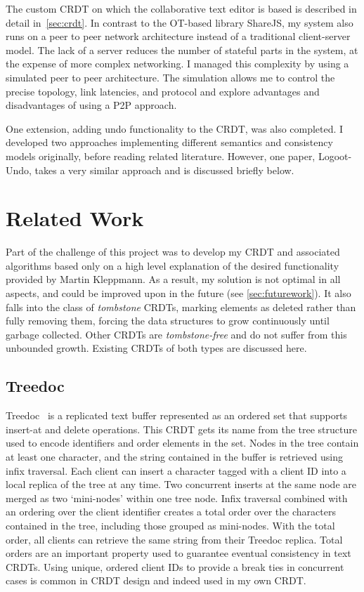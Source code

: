 \documentclass[12pt,a4paper,twoside,openright]{report}
\begin{document}
The custom CRDT on which the collaborative text editor is based is described in detail in~\cref{sec:crdt}. In contrast to the OT-based library ShareJS, my system also runs on a peer to peer network architecture instead of a traditional client-server model. The lack of a server reduces the number of stateful parts in the system, at the expense of more complex networking. I managed this complexity by using a simulated peer to peer architecture. The simulation allows me to control the precise topology, link latencies, and protocol and explore advantages and disadvantages of using a P2P approach. 

One extension, adding undo functionality to the CRDT, was also completed. I developed two approaches implementing different semantics and consistency models originally, before reading related literature. However, one paper, Logoot-Undo, takes a very similar approach and is discussed briefly below.

\section{Related Work} \label{sec:relatedwork}

Part of the challenge of this project was to develop my CRDT and associated algorithms based only on a high level explanation of the desired functionality provided by Martin Kleppmann. As a result, my solution is not optimal in all aspects, and could be improved upon in the future (see \cref{sec:futurework}). It also falls into the class of \textit{tombstone} CRDTs, marking elements as deleted rather than fully removing them, forcing the data structures to grow continuously until garbage collected. Other CRDTs are \textit{tombstone-free} and do not suffer from this unbounded growth. Existing CRDTs of both types are discussed here.

\subsection{Treedoc}

Treedoc~\cite{preguica2009} is a replicated text buffer represented as an ordered set that supports insert-at and delete operations. This CRDT gets its name from the tree structure used to encode identifiers and order elements in the set. Nodes in the tree contain at least one character, and the string contained in the buffer is retrieved using infix traversal. Each client can insert a character tagged with a client ID into a local replica of the tree at any time. Two concurrent inserts at the same node are merged as two `mini-nodes' within one tree node. Infix traversal combined with an ordering over the client identifier creates a total order over the characters contained in the tree, including those grouped as mini-nodes. With the total order, all clients can retrieve the same string from their Treedoc replica. Total orders are an important property used to guarantee eventual consistency in text CRDTs. Using unique, ordered client IDs to provide a break ties in concurrent cases is common in CRDT design and indeed used in my own CRDT.
\end{document}
